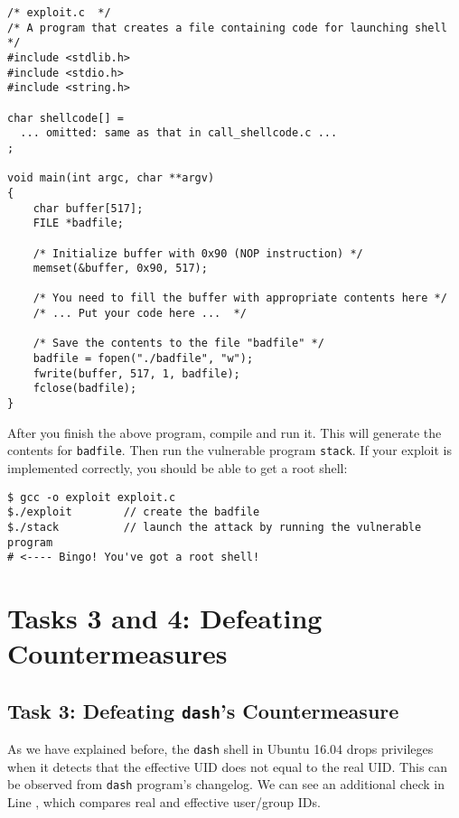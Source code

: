 \begin{lstlisting}
/* exploit.c  */
/* A program that creates a file containing code for launching shell */
#include <stdlib.h>
#include <stdio.h>
#include <string.h>

char shellcode[] =
  ... omitted: same as that in call_shellcode.c ...
;							        

void main(int argc, char **argv)
{
    char buffer[517];
    FILE *badfile;

    /* Initialize buffer with 0x90 (NOP instruction) */
    memset(&buffer, 0x90, 517);

    /* You need to fill the buffer with appropriate contents here */ 
    /* ... Put your code here ...  */

    /* Save the contents to the file "badfile" */
    badfile = fopen("./badfile", "w");
    fwrite(buffer, 517, 1, badfile);
    fclose(badfile);
}
\end{lstlisting}
 
After you finish the above program, compile and run it. This will generate
the contents for \texttt{badfile}. Then run the vulnerable 
program {\tt stack}. If your exploit is implemented correctly, you should 
be able to get a root shell:  

\begin{lstlisting}
$ gcc -o exploit exploit.c
$./exploit        // create the badfile
$./stack          // launch the attack by running the vulnerable program
# <---- Bingo! You've got a root shell! 
\end{lstlisting}


\section{Tasks 3 and 4: Defeating Countermeasures}

\subsection{Task 3: Defeating \texttt{dash}'s Countermeasure}

As we have explained before, the \texttt{dash} shell in Ubuntu 16.04 drops privileges 
when it detects that the effective UID does not equal to the real UID.
This can be observed from \texttt{dash} program's changelog.
We can see an additional check in Line , which
compares real and effective user/group IDs.




